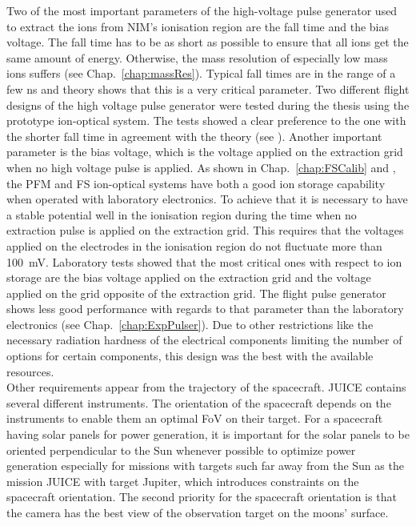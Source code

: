 	Two of the most important parameters of the high-voltage pulse generator used to extract the ions from NIM's ionisation region are the fall time and the bias voltage. The fall time has to be as short as possible to ensure that all ions get the same amount of energy. Otherwise, the mass resolution of especially low mass ions suffers (see Chap.~\ref{chap:massRes}). Typical fall times are in the range of a few ns and theory shows that this is a very critical parameter. Two different flight designs of the high voltage pulse generator were tested during the thesis using the prototype ion-optical system. The tests showed a clear preference to the one with the shorter fall time in agreement with the theory (see \cite{Lasi_IEEE2020}). Another important parameter is the bias voltage, which is the voltage applied on the extraction grid when no high voltage pulse is applied. As shown in Chap.~\ref{chap:FSCalib} and \cite{Foehn2021}, the PFM and FS ion-optical systems have both a good ion storage capability when operated with laboratory electronics. To achieve that it is necessary to have a stable potential well in the ionisation region during the time when no extraction pulse is applied on the extraction grid. This requires that the voltages applied on the electrodes in the ionisation region do not fluctuate more than 100~mV. Laboratory tests showed that the most critical ones with respect to ion storage are the bias voltage applied on the extraction grid and the voltage applied on the grid opposite of the extraction grid. The flight pulse generator shows less good performance with regards to that parameter than the laboratory electronics (see Chap.~\ref{chap:ExpPulser}). Due to other restrictions like the necessary radiation hardness of the electrical components limiting the number of options for certain components, this design was the best with the available resources.\\
	Other requirements appear from the trajectory of the spacecraft. JUICE contains several different instruments. The orientation of the spacecraft depends on the instruments to enable them an optimal FoV on their target. For a spacecraft having solar panels for power generation, it is important for the solar panels to be oriented perpendicular to the Sun whenever possible to optimize power generation especially for missions with targets such far away from the Sun as the mission JUICE with target Jupiter, which introduces constraints on the spacecraft orientation. The second priority for the spacecraft orientation is that the camera has the best view of the observation target on the moons' surface.\\
